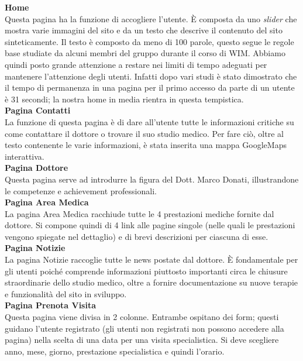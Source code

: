 \bigskip

\textbf{Home} \\ 
Questa pagina ha la funzione di accogliere l’utente. È composta da uno \textit{slider} che mostra varie immagini del sito e da un testo che descrive il contenuto del sito sinteticamente.
Il testo è composto da meno di 100 parole, questo segue le regole base studiate da alcuni membri del gruppo durante il corso di WIM. Abbiamo quindi posto grande attenzione a restare nei limiti di tempo adeguati per mantenere l’attenzione degli utenti.
Infatti dopo vari studi è stato dimostrato che il tempo di permanenza in una pagina per il primo accesso da parte di un utente è 31 secondi; la nostra home in media rientra in questa tempistica. \\

\textbf{Pagina Contatti} \\ 
La funzione di questa pagina è di dare all’utente tutte le informazioni critiche su come contattare il dottore o trovare il suo studio medico.
Per fare ciò, oltre al testo contenente le varie informazioni, è stata inserita una mappa GoogleMaps interattiva. \\

\textbf{Pagina Dottore} \\
Questa pagina serve ad introdurre la figura del Dott. Marco Donati, illustrandone le competenze e achievement professionali. \\

\textbf{Pagina Area Medica} \\
La pagina Area Medica racchiude tutte le 4 prestazioni mediche fornite dal dottore. Si compone quindi di 4 link alle pagine singole (nelle quali le prestazioni vengono spiegate nel dettaglio) e di brevi descrizioni per ciascuna di esse. \\

\textbf{Pagina Notizie} \\
La pagina Notizie raccoglie tutte le news postate dal dottore. È fondamentale per gli utenti poiché comprende informazioni piuttosto importanti circa le chiusure straordinarie dello studio medico, oltre a fornire documentazione su nuove terapie e funzionalità del sito in sviluppo. \\

\textbf{Pagina Prenota Visita} \\
Questa pagina viene divisa in 2 colonne. Entrambe ospitano dei form;
questi guidano l’utente registrato (gli utenti non registrati non possono accedere alla pagina) nella scelta di una data per una visita specialistica.
Si deve scegliere anno, mese, giorno, prestazione specialistica e quindi l’orario. \\

